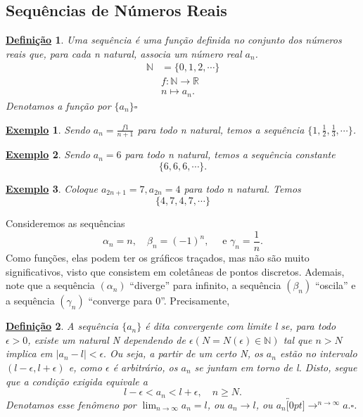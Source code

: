 \documentclass{article}
\newtheorem*{def*}{\underline{Defini\c c\~ao}}
\newtheorem{example}{\underline{Exemplo}}
\begin{document}
\subsection{Sequ\^encias de N\'umeros Reais}
\begin{def*}
  Uma sequ\^encia \'e uma fun\c c\~ao definida no conjunto dos n\'umeros reais que, para cada n natural, associa um n\'umero real $a_{n}$.
  \begin{align*}
    \mathbb{N}&=\{0, 1, 2, \cdots\}\\
              &f:\mathbb{N}\rightarrow \mathbb{R}\\
              &n\mapsto a_{n}.
  \end{align*}
  Denotamos a fun\c c\~ao por $\{a_{n}\}\square$
\end{def*}
 \begin{example}
   Sendo $a_{n}=\frac{f1}{n+1}$ para todo n natural, temos a sequ\^encia $\{1, \frac{1}{2}, \frac{1}{3}, \cdots\}$. 
 \end{example}
\begin{example}
  Sendo $a_{n} = 6$ para todo n natural, temos a sequ\^encia constante 
  $$
    \{6, 6, 6,\cdots\}.
  $$
\end{example}
\begin{example}
  Coloque $a_{2n+1} = 7, a_{2n}=4$ para todo n natural. Temos 
  $$
    \{4, 7, 4, 7, \cdots\}
  $$
\end{example}
  Consideremos as sequ\^encias
  $$
    \alpha_{n} = n, \quad \beta_{n} = (-1)^{n},\quad \text{ e } \gamma_{n} = \frac{1}{n}.
  $$
  Como fun\c c\~oes, elas podem ter os gr\'aficos tra\c cados, mas n\~ao s\~ao muito significativos, visto que consistem em
colet\^aneas de pontos discretos. Ademais, note que a sequ\^encia $(\alpha_{n})$ ``diverge'' para infinito, a sequ\^encia
$(\beta_{n})$ ``oscila'' e a sequ\^encia $(\gamma_{n})$ ``converge para 0''. Precisamente, 
 \begin{def*}
   A sequ\^encia $\{a_{n}\}$ \'e dita convergente com limite l se, para todo $\epsilon > 0$, existe um natural
N dependendo de $\epsilon (N = N(\epsilon)\in \mathbb{N})$ tal que $n > N$ implica em $|a_{n} - l|< \epsilon.$
  Ou seja, a partir de um certo N, os $a_{n}$ est\~ao no intervalo $(l-\epsilon, l+\epsilon)$ e, como $\epsilon$
\'e arbitr\'ario, os $a_{n}$ se juntam em torno de l. Disto, segue que a condi\c c\~ao exigida equivale a
  $$
  l - \epsilon < a_{n} < l + \epsilon, \quad n\geq{N}.
  $$
Denotamos esse fen\^omeno por $\displaystyle\lim_{n\to\infty}a_{n} = l$, ou $a_{n}\rightarrow l$, ou $a_{n}\overbracket[0pt]{\longrightarrow}^{n\to \infty}a.\square$.
\end{def*}
\end{document}
